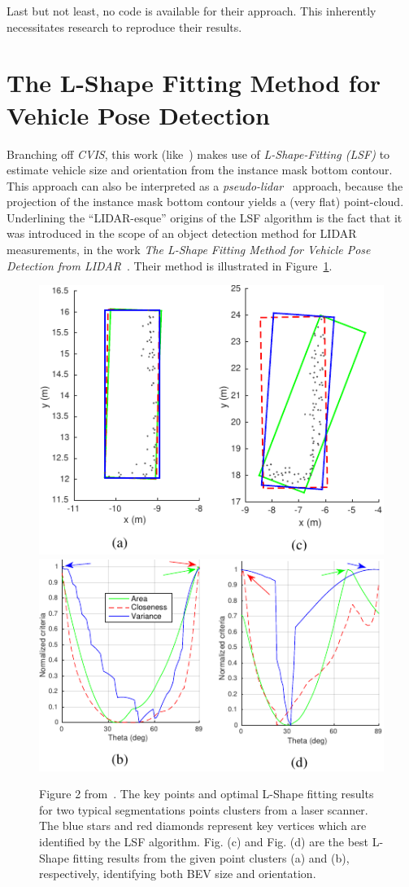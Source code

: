 Last but not least, no code is available for their approach.
This inherently necessitates research to reproduce their results.

\section{The L-Shape Fitting Method for Vehicle Pose Detection}
\label{sec:related-lshape-fitting}

Branching off \textit{CVIS}, this work (like~\cite{leonthesis}) makes use of \textit{L-Shape-Fitting (LSF)} to estimate vehicle size and orientation from the instance mask bottom contour.
This approach can also be interpreted as a \textit{pseudo-lidar}~\cite{survey2022} approach, because the projection of the instance mask bottom contour yields a (very flat) point-cloud.
Underlining the \enquote{LIDAR-esque} origins of the LSF algorithm is the fact that it was introduced in the scope of an object detection method for LIDAR measurements, in the work \textit{The L-Shape Fitting Method for Vehicle Pose Detection from LIDAR}~\cite{zhang2017efficient}.
Their method is illustrated in Figure~\ref{fig:related-lsf}.

\begin{figure}[htb]
    \centering
    \includegraphics[width=0.49\linewidth]{figures/l_shape_fitting_fig_2_1-cropped}
    \includegraphics[width=0.49\linewidth]{figures/l_shape_fitting_fig_2_2-cropped}
    \caption{Figure 2 from~\cite{zhang2017efficient}. The key points and optimal L-Shape fitting results for two typical segmentations points clusters from a laser scanner. The blue stars and red diamonds represent key vertices which are identified by the LSF algorithm. Fig. (c) and Fig. (d) are the best L-Shape fitting results from the given point clusters (a) and (b), respectively, identifying both BEV size and orientation.}
    \label{fig:related-lsf}
\end{figure}

